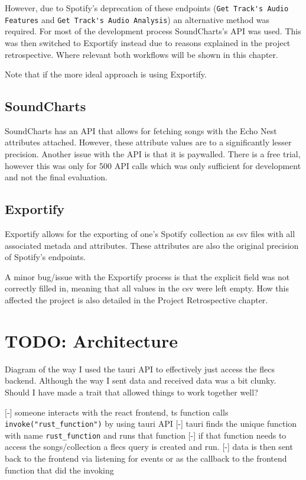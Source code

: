However, due to Spotify's deprecation of these endpoints (\lstinline|Get Track's Audio Features| and \lstinline|Get Track's Audio Analysis|) an alternative method was required. For most of the development process SoundCharts's API was used. This was then switched to Exportify instead due to reasons explained in the project retrospective. Where relevant both workflows will be shown in this chapter.

Note that if the more ideal approach is using Exportify.

\subsection{SoundCharts}
SoundCharts has an API that allows for fetching songs with the Echo Nest attributes attached. However, these attribute values are to a significantly lesser precision. Another issue with the API is that it is paywalled. There is a free trial, however this was only for 500 API calls which was only sufficient for development and not the final evaluation.

\subsection{Exportify}
Exportify allows for the exporting of one's Spotify collection as csv files with all associated metada and attributes. These attributes are also the original precision of Spotify's endpoints.

A minor bug/issue with the Exportify process is that the explicit field was not correctly filled in, meaning that all values in the csv were left empty. How this affected the project is also detailed in the Project Retrospective chapter.

\section{TODO: Architecture}%
Diagram of the way I used the tauri API to effectively just access the flecs backend. Although the way I sent data and received data was a bit clunky. Should I have made a trait that allowed things to work together well?

[-] someone interacts with the react frontend, ts function calls \texttt{invoke("rust\_function")} by using tauri API
[-] tauri finds the unique function with name \texttt{rust\_function} and runs that function
[-] if that function needs to access the songs/collection a flecs query is created and run.
[-] data is then sent back to the frontend via listening for events or as the callback to the frontend function that did the invoking

